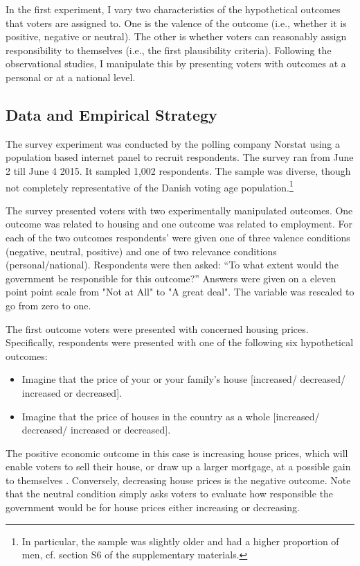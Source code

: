 \documentclass[a4paper,11pt]{article}
\begin{document}
	
	In the first experiment, I vary two characteristics of the hypothetical outcomes that voters are assigned to. One is the valence of the outcome (i.e., whether it is positive, negative or neutral). The other is whether voters can reasonably assign responsibility to themselves (i.e., the first plausibility criteria). Following the observational studies, I manipulate this by presenting voters with outcomes at a personal or at a national level.
	
	\subsection*{Data and Empirical Strategy}
	The survey experiment was conducted by the polling company Norstat using a population based internet panel to recruit respondents. The survey ran from June 2 till June 4 2015. It sampled 1,002 respondents. The sample was diverse, though not completely representative of the Danish voting age population.\footnote{In particular, the sample was slightly older and had a higher proportion of men, cf. section S6 of the supplementary materials.}
	
	The survey presented voters with two experimentally manipulated outcomes. One outcome was related to housing and one outcome was related to employment. For each of the two outcomes respondents' were given one of three valence conditions (negative, neutral, positive) and one of two relevance conditions (personal/national). Respondents were then asked: ``To what extent would the government be responsible for this outcome?'' Answers were given on a eleven point point scale from "Not at All" to "A great deal". The variable was rescaled to go from zero to one. 
	
	The first outcome voters were presented with concerned housing prices. Specifically, respondents were presented with one of the following six  hypothetical outcomes:
	
	\begin{itemize} 
		\item [1,2,3] Imagine that the price of your or your family's house [increased/ decreased/ increased or decreased].
		\item [4,5,6] Imagine that the price of houses in the country as a whole [increased/ decreased/ increased or decreased].
	\end{itemize}
	
	The positive economic outcome in this case is increasing house prices, which will enable voters to sell their house, or draw up a larger mortgage, at a possible gain to themselves \citep{ansell2014political}. Conversely, decreasing house prices is the negative outcome. Note that the neutral condition simply asks voters to evaluate how responsible the government would be for house prices either increasing or decreasing. 
	
\end{document}
